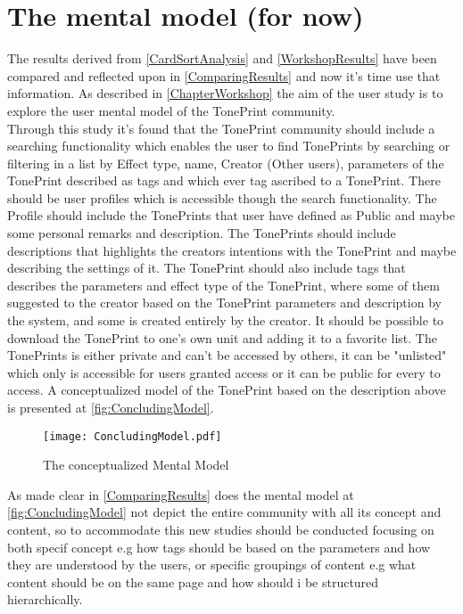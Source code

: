 \section{The mental model (for now)}
\label{MentalModelForNow}
%
The results derived from \autoref{CardSortAnalysis} and \autoref{WorkshopResults} have been compared and reflected upon in \autoref{ComparingResults} and now it's time use that information. As described in \autoref{ChapterWorkshop} the aim of the user study is to explore the user mental model of the TonePrint community.\\ 
Through this study it's found that the TonePrint community should include a searching functionality which enables the user to find TonePrints by searching or filtering in a list by Effect type, name, Creator (Other users), parameters of the TonePrint described as tags and which ever tag ascribed to a TonePrint. There should be user profiles which is accessible though the search functionality. The Profile should include the TonePrints that user have defined as Public and maybe some personal remarks and description. The TonePrints should include descriptions that highlights the creators intentions with the TonePrint and maybe describing the settings of it. The TonePrint should also include tags that describes the parameters and effect type of the TonePrint, where some of them suggested to the creator based on the TonePrint parameters and description by the system, and some is created entirely by the creator. It should be possible to download the TonePrint to one's own unit and adding it to a favorite list. The TonePrints is either private and can't be accessed by others, it can be "unlisted" which only is accessible for users granted access or it can be public for every to access. A conceptualized model of the TonePrint based on the description above is presented at \autoref{fig:ConcludingModel}.
%
\begin{figure}[H]
	\centering
	\texttt{[image: ConcludingModel.pdf]}
	\caption{The conceptualized Mental Model}
	\label{fig:ConcludingModel}
\end{figure}
%
As made clear in \autoref{ComparingResults} does the mental model at \autoref{fig:ConcludingModel} not depict the entire community with all its concept and content, so to accommodate this new studies should be conducted focusing on both specif concept e.g how tags should be based on the parameters and how they are understood by the users, or specific groupings of content e.g what content should be on the same page and how should i be structured hierarchically. \\
